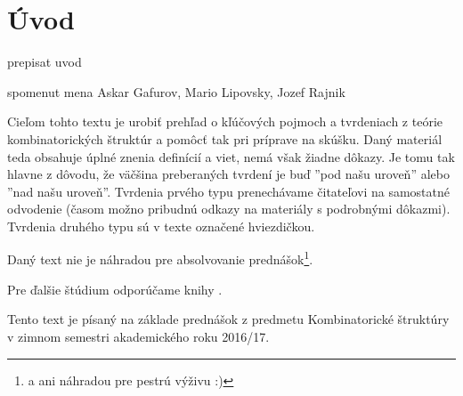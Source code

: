 \chapter*{Úvod}

\TODO prepisat uvod

\TODO spomenut mena Askar Gafurov, Mario Lipovsky, Jozef Rajnik

Cieľom tohto textu je urobiť prehľad o kľúčových pojmoch a tvrdeniach z teórie kombinatorických štruktúr a pomôcť tak pri príprave na skúšku. 
Daný materiál teda obsahuje úplné znenia definícií a viet, nemá však žiadne dôkazy. Je tomu tak hlavne z dôvodu, že väčšina preberaných
tvrdení je buď ''pod našu uroveň'' alebo ''nad našu uroveň''. Tvrdenia prvého typu prenechávame čitateľovi na samostatné odvodenie (časom možno pribudnú odkazy
na materiály s podrobnými dôkazmi). Tvrdenia druhého typu sú v texte označené hviezdičkou.

Daný text nie je náhradou pre absolvovanie prednášok\footnote{a ani náhradou pre pestrú výživu :)}.

Pre ďalšie štúdium odporúčame knihy \TODO.

Tento text je písaný na základe prednášok z predmetu Kombinatorické štruktúry v zimnom semestri akademického roku 2016/17.
